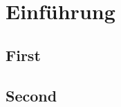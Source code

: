 \section{Einführung}  
    \subsection{First}   
        \lipsum[1-2]
    \subsection{Second} 
        \lipsum[1]